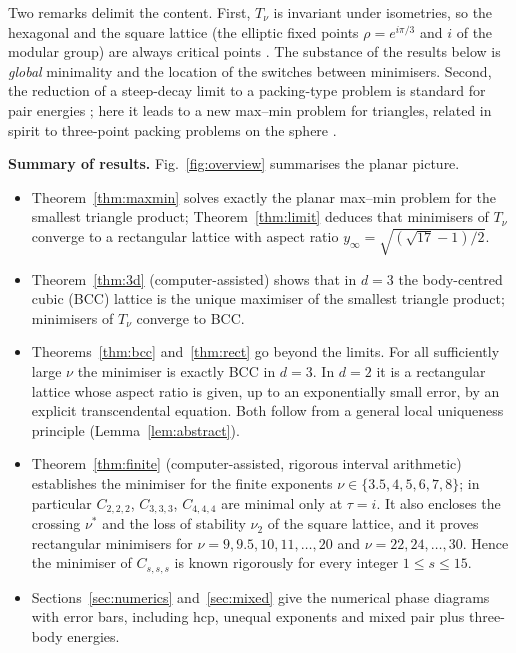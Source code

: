 \documentclass[10pt,twocolumn,a4paper]{article}
\theoremstyle{definition}
\begin{document}
Two remarks delimit the content. First, $T_\nu$ is invariant under isometries, so the hexagonal and the square lattice (the elliptic fixed points $\rho=e^{i\pi/3}$ and $i$ of the modular group) are always critical points \cite{BetCrit}. The substance of the results below is \emph{global} minimality and the location of the switches between minimisers. Second, the reduction of a steep-decay limit to a packing-type problem is standard for pair energies \cite{BST}; here it leads to a new max--min problem for triangles, related in spirit to three-point packing problems on the sphere \cite{Bilyk}.

\smallskip\noindent\textbf{Summary of results.} Fig.~\ref{fig:overview} summarises the planar picture.
\begin{itemize}\setlength\itemsep{1pt}
\item Theorem~\ref{thm:maxmin} solves exactly the planar max--min problem for the smallest triangle product; Theorem~\ref{thm:limit} deduces that minimisers of $T_\nu$ converge to a rectangular lattice with aspect ratio $y_\infty=\sqrt{(\sqrt{17}-1)/2}$.
\item Theorem~\ref{thm:3d} (computer-assisted) shows that in $d=3$ the body-centred cubic (BCC) lattice is the unique maximiser of the smallest triangle product; minimisers of $T_\nu$ converge to BCC.
\item Theorems~\ref{thm:bcc} and~\ref{thm:rect} go beyond the limits. For all sufficiently large $\nu$ the minimiser is exactly BCC in $d=3$. In $d=2$ it is a rectangular lattice whose aspect ratio is given, up to an exponentially small error, by an explicit transcendental equation. Both follow from a general local uniqueness principle (Lemma~\ref{lem:abstract}).
\item Theorem~\ref{thm:finite} (computer-assisted, rigorous interval arithmetic) establishes the minimiser for the finite exponents $\nu\in\{3.5,4,5,6,7,8\}$; in particular $C_{2,2,2}$, $C_{3,3,3}$, $C_{4,4,4}$ are minimal only at $\tau=i$. It also encloses the crossing $\nu^*$ and the loss of stability $\nu_2$ of the square lattice, and it proves rectangular minimisers for $\nu=9,9.5,10,11,\dots,20$ and $\nu=22,24,\dots,30$. Hence the minimiser of $C_{s,s,s}$ is known rigorously for every integer $1\le s\le15$.
\item Sections~\ref{sec:numerics} and~\ref{sec:mixed} give the numerical phase diagrams with error bars, including hcp, unequal exponents and mixed pair plus three-body energies.
\end{itemize}
\end{document}
